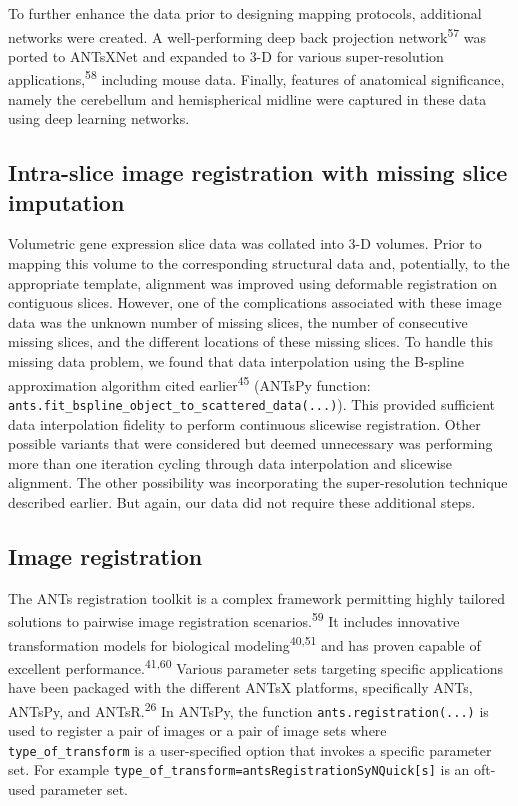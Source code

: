 \documentclass[
  12pt,
]{article}
\begin{document}
To further enhance the data prior to designing mapping protocols,
additional networks were created. A well-performing deep back projection
network\textsuperscript{57} was ported to ANTsXNet and expanded to 3-D
for various super-resolution applications,\textsuperscript{58} including
mouse data. Finally, features of anatomical significance, namely the
cerebellum and hemispherical midline were captured in these data using
deep learning networks.

\hypertarget{intra-slice-image-registration-with-missing-slice-imputation}{%
\subsection*{Intra-slice image registration with missing slice
imputation}\label{intra-slice-image-registration-with-missing-slice-imputation}}

Volumetric gene expression slice data was collated into 3-D volumes.
Prior to mapping this volume to the corresponding structural data and,
potentially, to the appropriate template, alignment was improved using
deformable registration on contiguous slices. However, one of the
complications associated with these image data was the unknown number of
missing slices, the number of consecutive missing slices, and the
different locations of these missing slices. To handle this missing data
problem, we found that data interpolation using the B-spline
approximation algorithm cited earlier\textsuperscript{45} (ANTsPy
function: \texttt{ants.fit\_bspline\_object\_to\_scattered\_data(...)}).
This provided sufficient data interpolation fidelity to perform
continuous slicewise registration. Other possible variants that were
considered but deemed unnecessary was performing more than one iteration
cycling through data interpolation and slicewise alignment. The other
possibility was incorporating the super-resolution technique described
earlier. But again, our data did not require these additional steps.

\hypertarget{image-registration}{%
\subsection*{Image registration}\label{image-registration}}

The ANTs registration toolkit is a complex framework permitting highly
tailored solutions to pairwise image registration
scenarios.\textsuperscript{59} It includes innovative transformation
models for biological modeling\textsuperscript{40,51} and has proven
capable of excellent performance.\textsuperscript{41,60} Various
parameter sets targeting specific applications have been packaged with
the different ANTsX platforms, specifically ANTs, ANTsPy, and
ANTsR.\textsuperscript{26} In ANTsPy, the function
\texttt{ants.registration(...)} is used to register a pair of images or
a pair of image sets where \texttt{type\_of\_transform} is a
user-specified option that invokes a specific parameter set. For example
\texttt{type\_of\_transform=\textquotesingle{}antsRegistrationSyNQuick{[}s{]}\textquotesingle{}}
is an oft-used parameter set.
\end{document}
